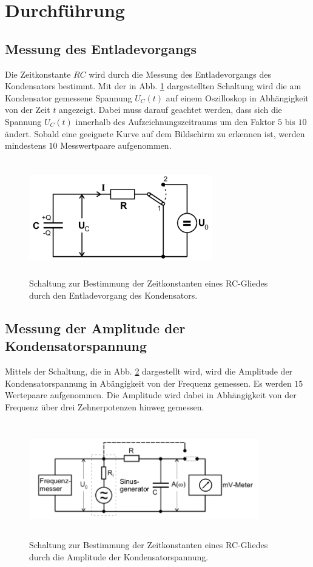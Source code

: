 \section{Durchführung}
\label{sec:Durchführung}

\subsection{Messung des Entladevorgangs}
Die Zeitkonstante $RC$ wird durch die Messung des Entladevorgangs des Kondensators bestimmt. 
Mit der in Abb. \ref{fig:4a} dargestellten Schaltung wird die am Kondensator gemessene Spannung $U_{C}(t)$ auf einem
Oszilloskop in Abhängigkeit von der Zeit $t$ angezeigt. Dabei muss darauf geachtet werden, dass sich die Spannung 
$U_{C}(t)$ innerhalb des Aufzeichnungszeitraums um den Faktor $5$ bis $10$ ändert. Sobald eine geeignete Kurve auf dem 
Bildschirm zu erkennen ist, werden mindestens $10$ Messwertpaare aufgenommen.
\begin{figure}
  \centering
  \includegraphics[width= 8cm, height=5cm]{build/4a.png}
  \caption{Schaltung zur Bestimmung der Zeitkonstanten eines RC-Gliedes durch den Entladevorgang des Kondensators.\cite{versuch}}
  \label{fig:4a}
\end{figure}

\subsection{Messung der Amplitude der Kondensatorspannung}
Mittels der Schaltung, die in Abb. \ref{fig:4b} dargestellt wird, wird die Amplitude der Kondensatorspannung in 
Abängigkeit von der Frequenz gemessen. Es werden $15$ Wertepaare aufgenommen.
Die Amplitude wird dabei in Abhängigkeit von der Frequenz über drei Zehnerpotenzen hinweg gemessen.
\begin{figure}
  \centering
  \includegraphics[width=10cm, height=5cm]{build/4b.png}
  \caption{Schaltung zur Bestimmung der Zeitkonstanten eines RC-Gliedes durch die Amplitude der Kondensatorspannung.\cite{versuch}}
  \label{fig:4b}
\end{figure}

